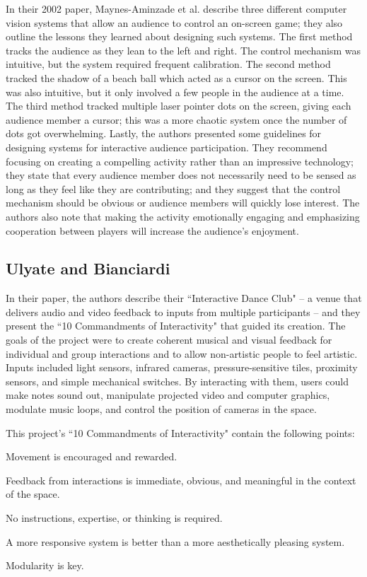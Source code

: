 In their 2002 paper, Maynes-Aminzade et al. describe three different computer vision systems that allow an audience to control an on-screen game; they also outline the lessons they learned about designing such systems. The first method tracks the audience as they lean to the left and right. The control mechanism was intuitive, but the system required frequent calibration. The second method tracked the shadow of a beach ball which acted as a cursor on the screen. This was also intuitive, but it only involved a few people in the audience at a time. The third method tracked multiple laser pointer dots on the screen, giving each audience member a cursor; this was a more chaotic system once the number of dots got overwhelming. Lastly, the authors presented some guidelines for designing systems for interactive audience participation. They recommend focusing on creating a compelling activity rather than an impressive technology; they state that every audience member does not necessarily need to be sensed as long as they feel like they are contributing; and they suggest that the control mechanism should be obvious or audience members will quickly lose interest. The authors also note that making the activity emotionally engaging and emphasizing cooperation between players will increase the audience's enjoyment.

\subsection{Ulyate and Bianciardi}

In their paper, the authors describe their ``Interactive Dance Club" -- a venue that delivers audio and video feedback to inputs from multiple participants -- and they present the ``10 Commandments of Interactivity" that guided its creation. The goals of the project were to create coherent musical and visual feedback for individual and group interactions and to allow non-artistic people to feel artistic. Inputs included light sensors, infrared cameras, pressure-sensitive tiles, proximity sensors, and simple mechanical switches. By interacting with them, users could make notes sound out, manipulate projected video and computer graphics, modulate music loops, and control the position of cameras in the space.

This project's ``10 Commandments of Interactivity" contain the following points:
\begin{itemize*}
	\item Movement is encouraged and rewarded.
	\item Feedback from interactions is immediate, obvious, and meaningful in the context of the space.
	\item No instructions, expertise, or thinking is required.
	\item A more responsive system is better than a more aesthetically pleasing system.
	\item Modularity is key.
\end{itemize*}

